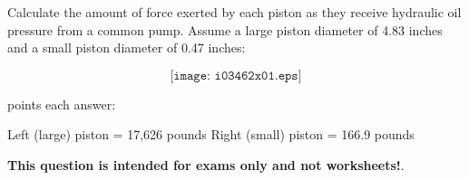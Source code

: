 

Calculate the amount of force exerted by each piston as they receive hydraulic oil pressure from a common pump.   Assume a large piston diameter of 4.83 inches and a small piston diameter of 0.47 inches:

$$\texttt{[image: i03462x01.eps]}$$







 points each answer:

\vskip 10pt

Left (large) piston = 17,626 pounds \hskip 30pt Right (small) piston = 166.9 pounds







{\bf This question is intended for exams only and not worksheets!}.



